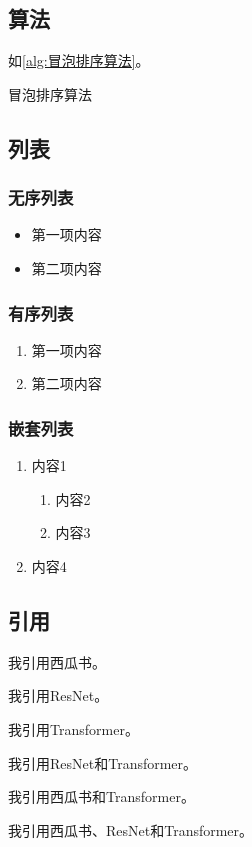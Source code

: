 

\subsection{算法}

如\cref{alg:冒泡排序算法}。

\begin{algorithm}[htb]
\caption{冒泡排序算法}
\label{alg:冒泡排序算法}
\end{algorithm}

\subsection{列表}

\subsubsection{无序列表}

\begin{itemize}
    \item 第一项内容
    \item 第二项内容
\end{itemize}

\subsubsection{有序列表}

\begin{enumerate}
    \item 第一项内容
    \item 第二项内容
\end{enumerate}

\subsubsection{嵌套列表}

\begin{enumerate}
    \item 内容1
    \begin{enumerate}
        \item 内容2
        \item 内容3
    \end{enumerate}
    \item 内容4
\end{enumerate}

\subsection{引用}

我引用西瓜书\cite{西瓜书}。

我引用ResNet\cite{ResNet}。

我引用Transformer\cite{Transformer}。

我引用ResNet和Transformer\cite{ResNet, Transformer}。

我引用西瓜书和Transformer\cite{西瓜书, Transformer}。

我引用西瓜书、ResNet和Transformer\cite{西瓜书, ResNet, Transformer}。
